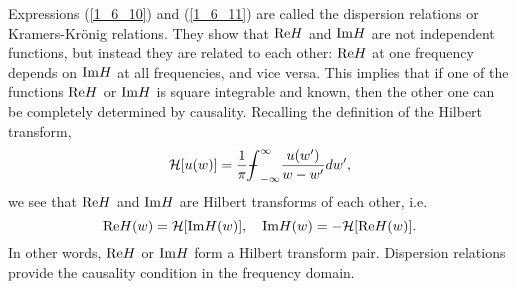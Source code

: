 \documentclass[journal,twoside]{IEEEtran}
\begin{document}
Expressions (\ref{1_6_10}) and (\ref{1_6_11}) are called the dispersion relations or Kramers-Kr\"onig  relations. They show that ${\mathop{\rm Re}\nolimits} H$ and ${\mathop{\rm Im}\nolimits} H$ are not independent functions, but instead they are related to each other: ${\mathop{\rm Re}\nolimits} H$ at one frequency depends on ${\mathop{\rm Im}\nolimits} H$ at all frequencies, and vice versa. This implies that if one of the functions ${\mathop{\rm Re}\nolimits} H$ or ${\mathop{\rm Im}\nolimits} H$ is square integrable and known, then the other one can be   completely determined by causality. 
Recalling the definition of the Hilbert transform,
\[
{\mathcal H}[u(w)]=\frac{1}{\pi}{{\mathchoice
   {{{\setbox0=\hbox{$\displaystyle{\textstyle{-}}{\int}$}
     \vcenter{\hbox{$\textstyle{-}$}}\kern-.5\wd0}}}   {{{\setbox0=\hbox{$\textstyle{\scriptstyle{-}}{\int}$}
     \vcenter{\hbox{$\scriptstyle{-}$}}\kern-.5\wd0}}}   {{{\setbox0=\hbox{$\scriptstyle{\scriptscriptstyle{-}}{\int}$}
     \vcenter{\hbox{$\scriptscriptstyle{-}$}}\kern-.5\wd0}}}   {{{\setbox0=\hbox{$\scriptscriptstyle{\scriptscriptstyle{-}}{\int}$}
     \vcenter{\hbox{$\scriptscriptstyle{-}$}}\kern-.5\wd0}}}   \!\int}}_{-\infty}^\infty \frac{u(w')}{w-w'} dw',
\]
we see that ${\mathop{\rm Re}\nolimits} H$ and ${\mathop{\rm Im}\nolimits} H$ are Hilbert transforms of each other, i.e.
\begin{equation} \label{Hilbert_pair}
{\mathop{\rm Re}\nolimits} H(w)={\mathcal H}[{\mathop{\rm Im}\nolimits} H(w)], \quad {\mathop{\rm Im}\nolimits} H(w)=-{\mathcal H}[{\mathop{\rm Re}\nolimits} H(w)].
\end{equation}
In other words, ${\mathop{\rm Re}\nolimits} H$ or ${\mathop{\rm Im}\nolimits} H$  form a Hilbert transform pair. Dispersion relations provide the causality condition in the frequency domain.
\end{document}
